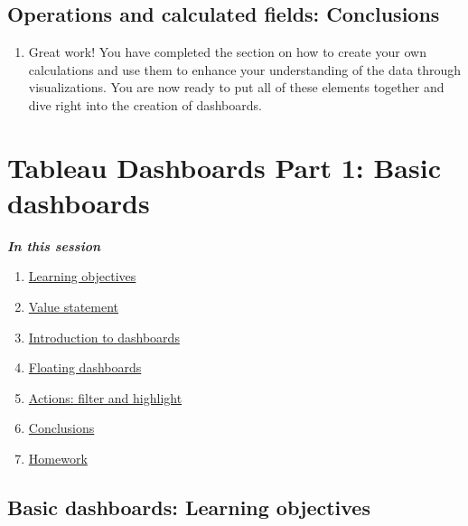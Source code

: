 \documentclass[
]{book}
\providecommand{\tightlist}{%
  \setlength{\itemsep}{0pt}\setlength{\parskip}{0pt}}
\begin{document}
\hypertarget{operations-and-calculated-fields-conclusions}{%
\subsection{Operations and calculated fields: Conclusions}\label{operations-and-calculated-fields-conclusions}}

\begin{enumerate}
\def\labelenumi{\arabic{enumi}.}
\tightlist
\item
  Great work! You have completed the section on how to create your own calculations and use them to enhance your understanding of the data through visualizations. You are now ready to put all of these elements together and dive right into the creation of dashboards.
\end{enumerate}

\hypertarget{tableau-dashboards-part-1-basic-dashboards}{%
\section{Tableau Dashboards Part 1: Basic dashboards}\label{tableau-dashboards-part-1-basic-dashboards}}

\textbf{\emph{In this session}}

\begin{enumerate}
\def\labelenumi{\arabic{enumi}.}
\tightlist
\item
  \protect\hyperlink{basic-dashboards-learning-objectives}{Learning objectives}
\item
  \protect\hyperlink{basic-dashboards-value-statement}{Value statement}
\item
  \protect\hyperlink{introduction-to-dashboards}{Introduction to dashboards}
\item
  \protect\hyperlink{floating-dashboards}{Floating dashboards}
\item
  \protect\hyperlink{actions-filter-and-highlight}{Actions: filter and highlight}
\item
  \protect\hyperlink{basic-dashboards-conclusions}{Conclusions}
\item
  \protect\hyperlink{basic-dashboards-homework}{Homework}
\end{enumerate}

\hypertarget{basic-dashboards-learning-objectives}{%
\subsection{Basic dashboards: Learning objectives}\label{basic-dashboards-learning-objectives}}
\end{document}
